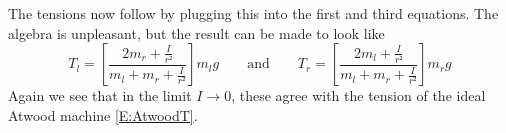 \begin{example}
\begin{solution}

The tensions now follow by plugging this into the first and third equations. The algebra is unpleasant, but the result can be made to look like 
$$
T_l =\left[ \frac {2{m_r}  + \frac I{r²}}{m_l + m_r  + \frac I{r²} }  \right] m_l g
\quad \quad \textrm{and} \quad \quad
T_r =\left[ \frac {2{m_l}  + \frac I{r²}}{m_l + m_r  + \frac I{r²}}  \right] m_r g
$$
Again we see that in the limit $I → 0$, these agree with the tension of the ideal Atwood machine \eqref{E:AtwoodT}.
\end{solution}
\end{example}


